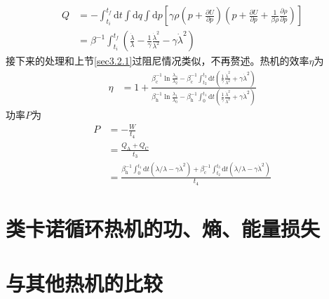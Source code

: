 \begin{equation}
    \begin{split}
        Q &=-\int_{t_i}^{t_f} \mathrm{d} t \int \mathrm{d} q \int \mathrm{d} p\left[\gamma \rho\left(p+\frac{\partial U}{\partial p}\right)\left(p+\frac{\partial U}{\partial p}+\frac{1}{\beta \rho} \frac{\partial \rho}{\partial p}\right)\right]\\
        &=\beta^{-1} \int_{t_i}^{t_f} \left(\frac{\dot{\lambda}}{\lambda}-\frac{1}{\gamma} \frac{\dot{\lambda}^{2}}{\lambda^{2}}-\gamma \dot{\lambda}^{2}\right)
    \end{split}
    \label{eq3.38}
\end{equation}
接下来的处理和上节\ref{sec3.2.1}过阻尼情况类似，不再赘述。热机的效率$\eta$为
\begin{equation}
    \begin{split}
        \eta &= 1+ \frac{\beta_{\mathrm{c}}^{-1} \ln{\frac{\lambda_3}{\lambda_2}} - \beta_{\mathrm{c}}^{-1} \int_{t_2}^{t_3} \mathrm{d} t    \left(\frac{1}{\gamma} \frac{\dot{\lambda}^{2}}{\lambda^{2}}+\gamma \dot{\lambda}^{2}\right) }{\beta_{\mathrm{h}}^{-1} \ln{\frac{\lambda_1}{\lambda_0}} - \beta_{\mathrm{h}}^{-1} \int_{0}^{t_1} \mathrm{d} t    \left(\frac{1}{\gamma} \frac{\dot{\lambda}^{2}}{\lambda^{2}}+\gamma \dot{\lambda}^{2}\right)}
    \end{split}
    \label{3.39}
\end{equation}
功率$P$为
\begin{equation}
    \begin{split}
        P&=-\frac{W}{t_4}\\
        &=\frac{Q_{\mathrm{A}} + Q_{\mathrm{C}}}{t_3}\\
        &=\frac{\beta_{\mathrm{h}}^{-1} \int_{0}^{t_1} \mathrm{d} t \left( {\dot{\lambda}}/{ \lambda}  -\gamma \dot{\lambda}^2 \right)+\beta_{\mathrm{c}}^{-1} \int_{t_2}^{t_3} \mathrm{d} t \left( {\dot{\lambda}}/{ \lambda}  -\gamma \dot{\lambda}^2 \right)}{t_4}
    \end{split}
    \label{eq3.40}
\end{equation}



\section{类卡诺循环热机的功、熵、能量损失}

\section{与其他热机的比较}